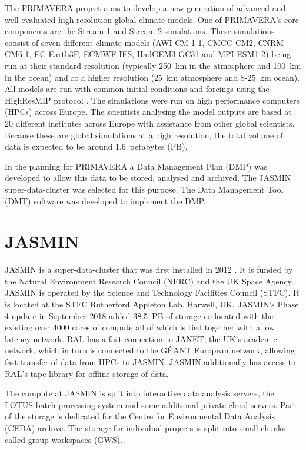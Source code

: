 \documentclass[gmd, manuscript]{copernicus}
\begin{document}


\introduction  %

The PRIMAVERA project aims to develop a new generation of advanced and well-evaluated high-resolution global climate models. One of PRIMAVERA's core components are the Stream 1 and Stream 2 simulations. These simulations consist of seven different climate models (AWI-CM-1-1, CMCC-CM2, CNRM-CM6-1, EC-Earth3P, ECMWF-IFS, HadGEM3-GC31 and MPI-ESM1-2) being run at their standard resolution (typically  250~km in the atmosphere and 100~km in the ocean) and at a higher resolution (25~km atmosphere and 8-25~km ocean). All models are run with common initial conditions and forcings using the HighResMIP protocol \citep{Haarsma2016}. The simulations were run on high performance computers (HPCs) across Europe. The scientists analysing the model outputs are based at 20 different institutes across Europe with assistance from other global scientists. Because these are global simulations at a high resolution, the total volume of data is expected to be around 1.6~petabytes (PB).

In the planning for PRIMAVERA a Data Management Plan (DMP) was developed to allow this data to be stored, analysed and archived. The JASMIN super-data-cluster was selected for this purpose. The Data Management Tool (DMT) software was developed to implement the DMP. 

\section{JASMIN}

JASMIN is a super-data-cluster that was first installed in 2012 \cite{lawrence2013storing}. It is funded by the Natural Environment Research Council (NERC) and the UK Space Agency. JASMIN is operated by the Science and Technology Facilities Council (STFC). It is located at the STFC Rutherford Appleton Lab, Harwell, UK. JASMIN's Phase 4 update in September 2018 added 38.5~PB of storage co-located with the existing over 4000 cores of compute all of which is tied together with a low latency network. RAL has a fast connection to JANET, the UK's academic network, which in turn is connected to the G\'{E}ANT European network, allowing fast transfer of data from HPCs to JASMIN. JASMIN additionally has access to RAL's tape library for offline storage of data.

The compute at JASMIN is split into interactive data analysis servers, the LOTUS batch processing system and some additional private cloud servers. Part of the storage is dedicated for the Centre for Environmental Data Analysis (CEDA) archive. The storage for individual projects is split into small chunks called group workspaces (GWS). 
\end{document}

